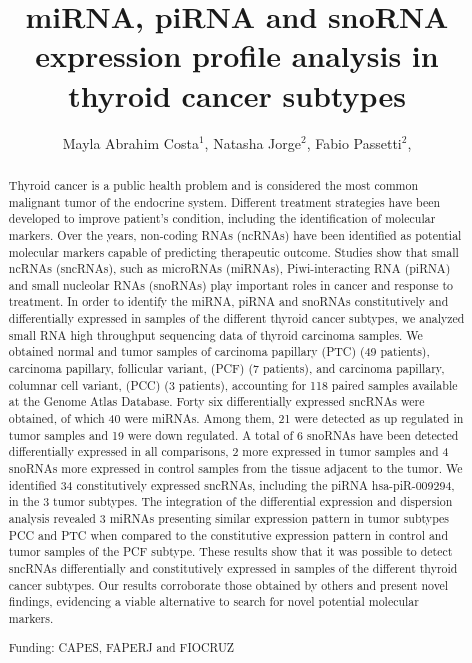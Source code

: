 \documentclass[twoside]{article}
\title{\vspace{-15mm}\fontsize{24pt}{10pt}\selectfont\textbf{ miRNA, piRNA and snoRNA expression profile analysis in thyroid cancer subtypes }} %
\author{ Mayla Abrahim Costa$^{1}$, Natasha Jorge$^{2}$, Fabio Passetti$^{2}$, }
\affil{ 1 IOC/FIOCRUZ - RJ

2 FIOCRUZ - IOC

 }
\date{}
\begin{document}
  
  
  \maketitle %
  
  
  \thispagestyle{fancy} %
  
  
  \begin{abstract}
  Thyroid cancer is a public health problem and is considered the most common malignant tumor of the endocrine system. Different treatment strategies have been developed to improve patient’s condition, including the identification of molecular markers. Over the years, non-coding RNAs (ncRNAs) have been identified as potential molecular markers capable of predicting therapeutic outcome. Studies show that small ncRNAs (sncRNAs), such as microRNAs (miRNAs), Piwi-interacting RNA (piRNA) and small nucleolar RNAs (snoRNAs) play important roles in cancer and response to treatment. In order to identify the miRNA, piRNA and snoRNAs constitutively and differentially expressed in samples of the different thyroid cancer subtypes, we analyzed small RNA high throughput sequencing data of thyroid carcinoma samples. We obtained normal and tumor samples of carcinoma papillary (PTC) (49 patients), carcinoma papillary, follicular variant, (PCF) (7 patients), and carcinoma papillary, columnar cell variant, (PCC) (3 patients), accounting for 118 paired samples available at the Genome Atlas Database. Forty six differentially expressed sncRNAs were obtained, of which 40 were miRNAs. Among them, 21 were detected as up regulated in tumor samples and 19 were down regulated. A total of 6 snoRNAs have been detected differentially expressed in all comparisons, 2 more expressed in tumor samples and 4 snoRNAs more expressed in control samples from the tissue adjacent to the tumor. We identified 34 constitutively expressed sncRNAs, including the piRNA hsa-piR-009294, in the 3 tumor subtypes. The integration of the differential expression and dispersion analysis revealed 3 miRNAs presenting similar expression pattern in tumor subtypes PCC and PTC when compared to the constitutive expression pattern in control and tumor samples of the PCF subtype. These results show that it was possible to detect sncRNAs differentially and constitutively expressed in samples of the different thyroid cancer subtypes. Our results corroborate those obtained by others and present novel findings, evidencing a viable alternative to search for novel potential molecular markers.
  
  Funding: CAPES, FAPERJ and FIOCRUZ \\ 
  \end{abstract}
  
\end{document}
